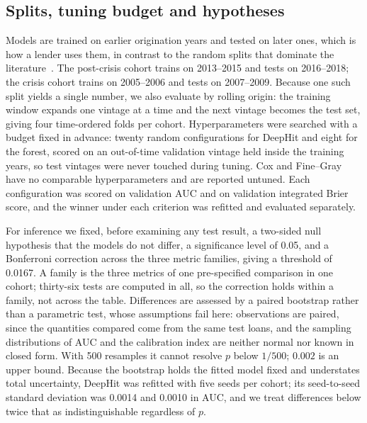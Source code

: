 \documentclass[11pt,journal]{IEEEtran}
\begin{document}
\subsection{Splits, tuning budget and hypotheses}
Models are trained on earlier origination years and tested on later ones, which
is how a lender uses them, in contrast to the random splits that dominate the
literature~\cite{DBLP:journals/jors/BlumenstockLS22}. The post-crisis cohort
trains on 2013--2015 and tests on 2016--2018; the crisis cohort trains on
2005--2006 and tests on 2007--2009. Because one such split yields a single
number, we also evaluate by rolling origin: the training window expands one
vintage at a time and the next vintage becomes the test set, giving four
time-ordered folds per cohort. Hyperparameters were searched with a budget
fixed in advance: twenty random configurations for DeepHit and eight for the
forest, scored on an out-of-time validation vintage held inside the training
years, so test vintages were never touched during tuning. Cox and Fine--Gray have no comparable
hyperparameters and are reported untuned. Each configuration was scored on validation AUC and on
validation integrated Brier score, and the winner under each criterion was
refitted and evaluated separately.

For inference we fixed, before examining any test result, a two-sided null
hypothesis that the models do not differ, a significance level of 0.05, and a
Bonferroni correction across the three metric families, giving a threshold of
0.0167. A family is the three metrics of one pre-specified comparison in one cohort;
thirty-six tests are computed in all, so the correction holds within a family,
not across the table. Differences are assessed by a paired bootstrap rather than a parametric test,
whose assumptions fail here: observations are paired, since the quantities
compared come from the same test loans, and the sampling distributions of AUC
and the calibration index are neither normal nor known in closed form. With 500
resamples it cannot resolve $p$ below $1/500$; $0.002$ is an upper bound.
Because the bootstrap holds the fitted model fixed and understates total
uncertainty, DeepHit was refitted with five seeds per cohort; its seed-to-seed
standard deviation was 0.0014 and 0.0010 in AUC, and we treat differences below
twice that as indistinguishable regardless of $p$.
\end{document}

